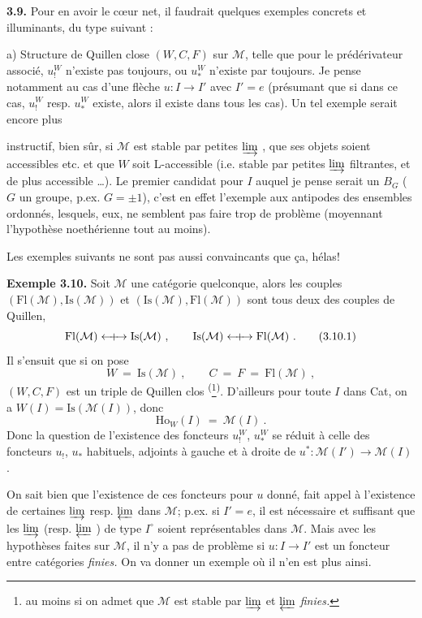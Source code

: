 \documentclass[11pt]{article}
\newcommand{\printedpage}[1]{\marginpar{\footnotesize p.~#1}}
\newcommand{\msp}[1]{\marginpar{\footnotesize [#1]}}
\newcommand{\Qcouple}{\mathrel{\leftarrow\mkern-9mu{+}\mkern-9mu\rightarrow}}
\newcommand{\M}{\mathcal{M}}
\newcommand{\Fl}{\mathrm{Fl}}
\newcommand{\Ho}{\mathrm{Ho}}
\newcommand{\limind}{\varinjlim}
\newcommand{\limproj}{\varprojlim}
\newcommand{\Is}{\mathrm{Is}}
\begin{document}
\textbf{3.9.} Pour en avoir le cœur net, il faudrait quelques exemples concrets et illuminants, du type suivant :

a) Structure de Quillen close $(W,C,F)$ sur $\M$, telle que pour le prédérivateur associé, $u^{W}_{!}$ n'existe pas toujours, ou $u^{W}_{*}$ n'existe par toujours. Je pense notamment au cas d'une flèche $u : I\longrightarrow I'$ avec $I'=e$ (présumant que si dans ce cas, $u^{W}_{!}$ resp. $u^{W}_{*}$ existe, alors il existe dans tous les cas). Un tel exemple serait encore plus %

\printedpage{24}
\msp{page 43}
instructif, bien sûr, si $\mathcal{M}$ est stable par petites $\limind$ , que ses objets soient accessibles etc. et que $W$ soit L-accessible (i.e. stable par petites $\limind$ filtrantes, et de plus accessible \dots). Le premier candidat pour $I$ auquel je pense serait un $B_G$ ($G$ un groupe, p.ex. $G=\pm1$), c'est en effet l'exemple aux antipodes des ensembles ordonnés, lesquels, eux, ne semblent pas faire trop de problème (moyennant l'hypothèse noethérienne tout au moins).

Les exemples suivants ne sont pas aussi convaincants que ça, hélas!

\textbf{Exemple 3.10.} Soit $\mathcal{M}$ une catégorie quelconque, alors les couples $(\Fl(\mathcal{M}),\Is(\mathcal{M}))$ et $(\Is(\mathcal{M}),\Fl(\mathcal{M}))$ sont tous deux des couples de Quillen,
\[
\Fl(\mathcal{M}) \Qcouple \Is(\mathcal{M}) \ , \qquad \Is(\mathcal{M}) \Qcouple \Fl(\mathcal{M}) \ . \tag*{(3.10.1)} %
\]
Il s'ensuit que si on pose
\[
W \ = \ \Is(\mathcal{M}) \ , \qquad C \ = \ F \ = \ \Fl(\mathcal{M}) \ , \tag*{(3.10.2)}
\]
$(W,C,F)$ est un triple de Quillen clos \textsuperscript{(}\footnote[22]{au moins si on admet que $\mathcal{M}$ est stable par $\limind$ et $\limproj$ \textit{finies.}}\textsuperscript{)}. D'ailleurs pour toute $I$ dans Cat, on a $W(I)=\Is(\mathcal{M}(I))$, donc
\[
\Ho_W(I) \ = \ \mathcal{M}(I) \ . \tag*{(3.10.3)}
\]
Donc la question de l'existence des foncteurs $u_!^W$, $u_*^W$ se réduit à celle des foncteurs $u_!$, $u_*$ habituels, adjoints à gauche et à droite de $u^* : \mathcal{M}(I') \longrightarrow \mathcal{M}(I)$.

\msp{page 44}
On sait bien que l'existence de ces foncteurs pour $u$ donné, fait appel à l'existence de certaines $\limind$ resp. $\limproj$ dans $\mathcal{M}$; p.ex. si $I'=e$, il est nécessaire et suffisant que les $\limind$ (resp. $\limproj$ ) de type $I^\circ$ soient représentables dans $\mathcal{M}$. Mais avec les hypothèses faites sur $\mathcal{M}$, il n'y a pas de problème si $u : I \longrightarrow I'$ est un foncteur entre catégories \textit{finies.} On va donner un exemple où il n'en est plus ainsi.
\end{document}
